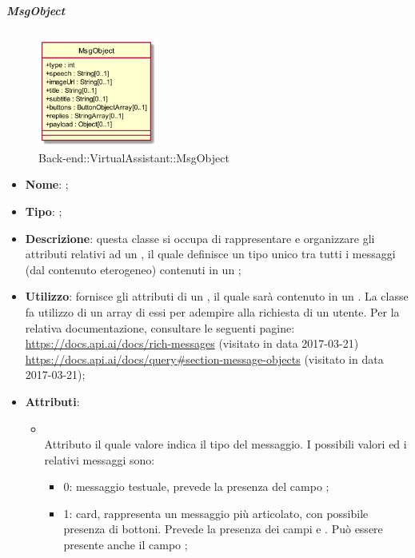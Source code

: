 \hypertarget{MsgObject_label}{\subparagraph{MsgObject}}
\begin{figure}[h]
	\centering
	\includegraphics[width=0.35\textwidth,height=\textheight,keepaspectratio]{images/ClassMsgObject.png}
	\caption{Back-end::VirtualAssistant::MsgObject}
\end{figure}
\begin{itemize}
	\item \textbf{Nome}: ;
	\item \textbf{Tipo}: ;
	\item \textbf{Descrizione}: questa classe si occupa di rappresentare e organizzare gli attributi relativi ad un , il quale definisce un tipo unico tra tutti i messaggi (dal contenuto eterogeneo) contenuti in un ;
	\item \textbf{Utilizzo}: fornisce gli attributi di un , il quale sarà contenuto in un .
La classe  fa utilizzo di un array di essi per adempire alla richiesta di un utente.
Per la relativa documentazione, consultare le seguenti pagine: \\
\url{https://docs.api.ai/docs/rich-messages}  (visitato in data 2017-03-21)\\
\url{https://docs.api.ai/docs/query#section-message-objects} (visitato in data 2017-03-21);
	\item \textbf{Attributi}:
	\begin{itemize}
		\item[]  \\
		Attributo il quale valore indica il tipo del messaggio. I possibili valori ed i relativi messaggi sono:
\begin{itemize}
  \item 0: messaggio testuale, prevede la presenza del campo ;
  \item 1: card, rappresenta un messaggio più articolato, con possibile presenza di bottoni. Prevede la presenza dei campi  e . Può essere presente anche il campo ;

\end{itemize}
\end{itemize}
\end{itemize}
